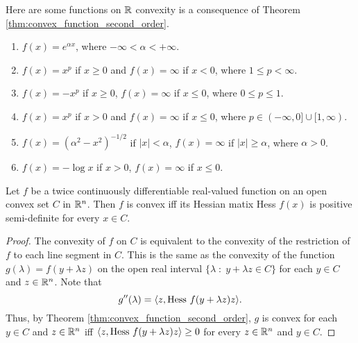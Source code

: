 \documentclass[11pt,a4paper]{article}
\begin{document}
\begin{example}\label{ex:convex_functions}
    Here are some functions on $\mathbb{R}$ convexity is a consequence of Theorem \ref{thm:convex_function_second_order}.
    \begin{enumerate}
        \item $f(x) = e^{\alpha x}$, where $-\infty < \alpha < +\infty$.
        \item $f(x) = x^p$ if $x\ge 0$ and $f(x) = \infty$ if $x<0$, where $1\le p< \infty$.
        \item $f(x) = -x^p$ if $x\ge 0$, $f(x) = \infty$ if $x\le 0$, where $0\le p\le 1$.
        \item $f(x) = x^p$ if $x> 0$ and $f(x) = \infty$ if $x\le 0$, where $p\in (-\infty,0]\cup [1,\infty)$.
        \item $f(x) = (\alpha^2-x^2)^{-1/2}$ if $|x|<\alpha$, $f(x) = \infty$ if $|x|\ge\alpha$, where $\alpha>0$.
        \item $f(x) = -\log{x}$ if $x>0$, $f(x) = \infty$ if $x\le 0$.
    \end{enumerate}
\end{example}

\begin{theorem}
    Let $f$ be a twice continuously differentiable real-valued function on an open convex set $C$ in $\mathbb{R}^n$. Then $f$ is convex iff its Hessian matix Hess $f(x)$ is positive semi-definite for every $x\in C$.
\end{theorem}

\begin{proof}
    The convexity of $f$ on $C$ is equivalent to the convexity of the restriction of $f$ to each line segment in $C$. This is the same as the convexity of the function $g(\lambda) = f(y+\lambda z)$ on the open real interval $\{\lambda\;:\;y+\lambda z\in C\}$ for each $y\in C$ and $z\in \mathbb{R}^n$. Note that 
    \begin{equation*}
        g^{\prime\prime}(\lambda) = \langle z, \text{Hess}\ f(y+\lambda z)z \rangle.
    \end{equation*}
    Thus, by Theorem \ref{thm:convex_function_second_order}, $g$ is convex for each $y\in C$ and $z\in \mathbb{R}^n$ iff $\langle z, \text{Hess}\ f(y+\lambda z)z \rangle\ge 0$ for every $z\in \mathbb{R}^n$ and $y\in C$.
\end{proof}
\end{document}
